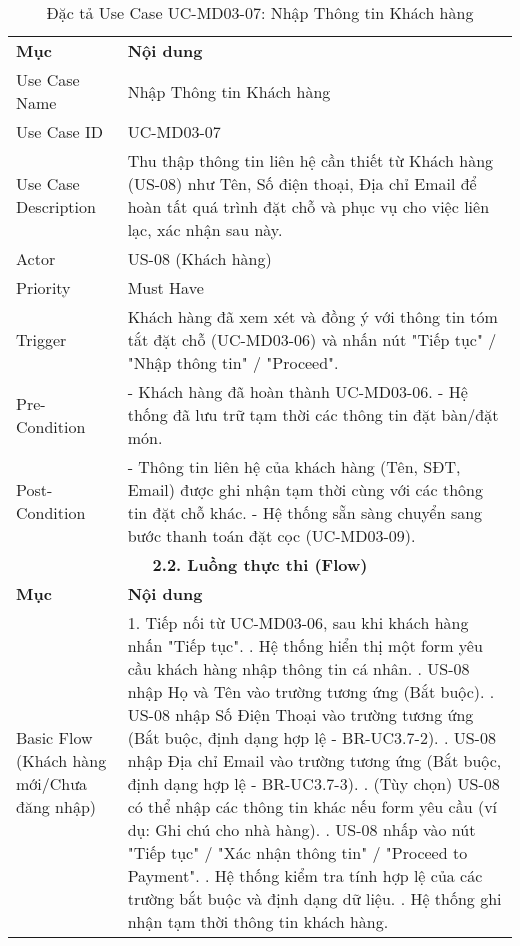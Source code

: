 \begin{longtable}{|m{4cm}|p{11cm}|}
\caption{Đặc tả Use Case UC-MD03-07: Nhập Thông tin Khách hàng} \label{tab:uc_md03_07} \\
\hline

\endhead %
\hline
\endfoot %
\hline
\endlastfoot %
\multicolumn{2}{|c|}{\textbf{2.1. Tóm tắt (Summary)}} \\
\hline
\textbf{Mục} & \textbf{Nội dung} \\
\hline
Use Case Name & Nhập Thông tin Khách hàng \\
\hline
Use Case ID & UC-MD03-07 \\
\hline
Use Case Description & Thu thập thông tin liên hệ cần thiết từ Khách hàng (US-08) như Tên, Số điện thoại, Địa chỉ Email để hoàn tất quá trình đặt chỗ và phục vụ cho việc liên lạc, xác nhận sau này. \\
\hline
Actor & US-08 (Khách hàng) \\
\hline
Priority & Must Have \\
\hline
Trigger & Khách hàng đã xem xét và đồng ý với thông tin tóm tắt đặt chỗ (UC-MD03-06) và nhấn nút "Tiếp tục" / "Nhập thông tin" / "Proceed". \\
\hline
Pre-Condition & - Khách hàng đã hoàn thành UC-MD03-06. \newline - Hệ thống đã lưu trữ tạm thời các thông tin đặt bàn/đặt món. \\
\hline
Post-Condition & - Thông tin liên hệ của khách hàng (Tên, SĐT, Email) được ghi nhận tạm thời cùng với các thông tin đặt chỗ khác. \newline - Hệ thống sẵn sàng chuyển sang bước thanh toán đặt cọc (UC-MD03-09). \\
\hline
\multicolumn{2}{|c|}{\textbf{2.2. Luồng thực thi (Flow)}} \\
\hline
\textbf{Mục} & \textbf{Nội dung} \\
\hline
Basic Flow (Khách hàng mới/Chưa đăng nhập) & 1. Tiếp nối từ UC-MD03-06, sau khi khách hàng nhấn "Tiếp tục". \newline 2. Hệ thống hiển thị một form yêu cầu khách hàng nhập thông tin cá nhân. \newline 3. US-08 nhập Họ và Tên vào trường tương ứng (Bắt buộc). \newline 4. US-08 nhập Số Điện Thoại vào trường tương ứng (Bắt buộc, định dạng hợp lệ - BR-UC3.7-2). \newline 5. US-08 nhập Địa chỉ Email vào trường tương ứng (Bắt buộc, định dạng hợp lệ - BR-UC3.7-3). \newline 6. (Tùy chọn) US-08 có thể nhập các thông tin khác nếu form yêu cầu (ví dụ: Ghi chú cho nhà hàng). \newline 7. US-08 nhấp vào nút "Tiếp tục" / "Xác nhận thông tin" / "Proceed to Payment". \newline 8. Hệ thống kiểm tra tính hợp lệ của các trường bắt buộc và định dạng dữ liệu. \newline 9. Hệ thống ghi nhận tạm thời thông tin khách hàng. \\

\end{longtable}
